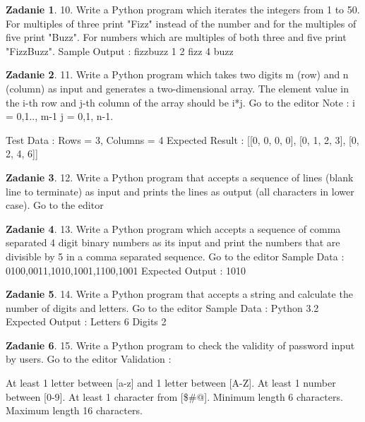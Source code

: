\documentclass[11pt]{article}
\theoremstyle{definition}
\newtheorem{zadanie}{Zadanie}
\begin{document}
\begin{zadanie}


10. Write a Python program which iterates the integers from 1 to 50. For multiples of three print "Fizz" instead of the number and for the multiples of five print "Buzz". For numbers which are multiples of both three and five print "FizzBuzz".
Sample Output :
fizzbuzz
1
2
fizz
4
buzz


\end{zadanie}

\begin{zadanie}


11. Write a Python program which takes two digits m (row) and n (column) as input and generates a two-dimensional array. The element value in the i-th row and j-th column of the array should be i*j. Go to the editor
Note :
i = 0,1.., m-1
j = 0,1, n-1.

Test Data : Rows = 3, Columns = 4
Expected Result : [[0, 0, 0, 0], [0, 1, 2, 3], [0, 2, 4, 6]]


\end{zadanie}

\begin{zadanie}


12. Write a Python program that accepts a sequence of lines (blank line to terminate) as input and prints the lines as output (all characters in lower case). Go to the editor


\end{zadanie}

\begin{zadanie}


13. Write a Python program which accepts a sequence of comma separated 4 digit binary numbers as its input and print the numbers that are divisible by 5 in a comma separated sequence. Go to the editor
Sample Data : 0100,0011,1010,1001,1100,1001
Expected Output : 1010


\end{zadanie}

\begin{zadanie}


14. Write a Python program that accepts a string and calculate the number of digits and letters. Go to the editor
Sample Data : Python 3.2
Expected Output :
Letters 6
Digits 2



\end{zadanie}

\begin{zadanie}


15. Write a Python program to check the validity of password input by users. Go to the editor
Validation :

    At least 1 letter between [a-z] and 1 letter between [A-Z].
    At least 1 number between [0-9].
    At least 1 character from [\$\#@].
    Minimum length 6 characters.
    Maximum length 16 characters.



\end{zadanie}
\end{document}
